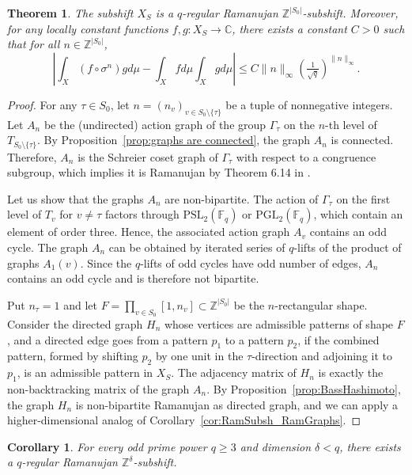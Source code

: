 \documentclass[12pt]{article}
\newtheorem{theorem}{Theorem}
\newtheorem{corollary}{Corollary}[theorem]
\theoremstyle{definition}
\def\bF{{\mathbb F}}
\begin{document}
\begin{theorem}
The subshift $X_S$ is a $q$-regular Ramanujan $\mathbb{Z}^{|S_0|}$-subshift. Moreover,
for any locally constant functions $f,g:X_S\rightarrow\mathbb{C}$, there exists a constant $C>0$ such that for all $n\in\mathbb{Z}^{|S_0|}$,
\begin{equation*}
\left|\int_X (f\circ \sigma^n)gd\mu - \int_Xfd\mu\int_Xgd\mu\right|\leq C\|n\|_\infty\left(\tfrac{1}{\sqrt{q}}\right)^{\|n\|_\infty}.
\end{equation*}
\end{theorem}
\begin{proof}
For any $\tau\in S_0$, let $n=(n_v)_{v\in S_0\setminus\{\tau\}}$ be a tuple of nonnegative integers. Let $A_n$ be the (undirected) action graph of the group $\Gamma_\tau$ on the $n$-th level of $T_{S_0\setminus\{\tau\}}$. By Proposition~\ref{prop:graphs are connected}, the graph $A_n$ is connected. Therefore, $A_n$ is the Schreier coset graph of $\Gamma_\tau$ with respect to a congruence subgroup, which implies it is Ramanujan by Theorem 6.14 in \cite{RSV2019}.

Let us show that the graphs $A_n$ are non-bipartite. The action of $\Gamma_\tau$ on the first level of $T_v$ for $v\neq\tau$ factors through $\mathrm{PSL}_2(\bF_q)$ or $\mathrm{PGL}_2(\bF_q)$, which contain an element of order three. Hence, the associated action graph $A_v$ contains an odd cycle. The graph $A_n$ can be obtained by iterated series of $q$-lifts of the product of graphs $A_1(v)$. Since the $q$-lifts of odd cycles have odd number of edges, $A_n$ contains an odd cycle and is therefore not bipartite.

Put $n_\tau=1$ and let $F=\prod_{v\in S_0}[1,n_v]\subset\mathbb{Z}^{|S_0|}$ be the $n$-rectangular shape. Consider the directed graph $H_{n}$ whose vertices are admissible patterns of shape $F$, and a directed edge goes from a pattern $p_1$ to a pattern $p_2$, if the combined pattern, formed by shifting $p_2$ by one unit in the $\tau$-direction and adjoining it to $p_1$, is an admissible pattern in $X_S$. The adjacency matrix of $H_n$ is exactly the non-backtracking matrix of the graph $A_n$. By Proposition~\ref{prop:BassHashimoto}, the graph $H_n$ is non-bipartite Ramanujan as directed graph, and we can apply a higher-dimensional analog of Corollary~\ref{cor:RamSubsh_RamGraphs}.
\end{proof}

\begin{corollary}
For every odd prime power $q\geq 3$ and dimension $\delta<q$, there exists a $q$-regular Ramanujan $\mathbb{Z}^\delta$-subshift.
\end{corollary}
\end{document}
